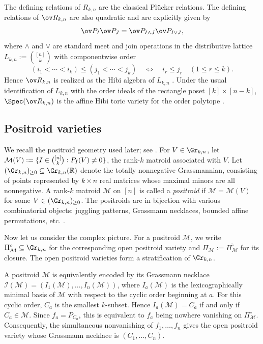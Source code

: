 \documentclass[11pt]{amsart}
\numberwithin{equation}{section}
\newcommand{\bR}{{\mathbb R}}
\begin{document}
The defining relations of  $R_{k,n}$ are the classical Pl\"ucker relations. 
The defining relations of $\ov R_{k,n}$ are also quadratic and are explicitly given by
\begin{equation}\label{eq:Hibi-relation}
\ov P_I\ov P_J
=
\ov P_{I\wedge J}\ov P_{I\vee J},
\end{equation}
where $\wedge$ and $\vee$ are standard meet and join operations in the distributive lattice
$L_{k,n}:=\binom{[n]}k$ with componentwise order
\[
(i_1<\cdots<i_k)\leq(j_1<\cdots<j_k)
\quad\Longleftrightarrow\quad
i_r\leq j_r\quad(1\leq r\leq k).
\]
Hence $\ov R_{k,n}$ is realized as the  Hibi algebra of $L_{k,n}$ \cite{Hibi87}.
Under the usual identification of $L_{k,n}$ with the order ideals of
the rectangle poset $[k]\times[n-k]$,
$\Spec(\ov R_{k,n})$ is the affine Hibi toric variety for the order polytope
\cite{Sta86}.


\subsection{Positroid varieties}
\label{subsec:positroid-varieties-prelim}

We recall the positroid geometry used later; see
\cite{Pos06,KLS13}.  For $V\in\Gr_{k,n}$, let
$\mathcal M(V):=\{I\in\tbinom{[n]}k:P_I(V)\neq0\}$, the
rank-$k$ matroid associated with $V$.  Let
$(\Gr_{k,n})_{\geq0}\subseteq\Gr_{k,n}(\bR)$ denote the totally
nonnegative Grassmannian, consisting of points represented by
$k\times n$ real matrices whose maximal minors are all
nonnegative.  A rank-$k$ matroid $\mathcal M$ on $[n]$ is
called a \emph{positroid} if
$\mathcal M=\mathcal M(V)$ for some
$V\in(\Gr_{k,n})_{\geq0}$. The positroids are in bijection with various combinatorial objects: juggling patterns, Grassmann necklaces, bounded affine permutations, etc. \cite{Pos06}. 

Now let us consider the complex picture.
For a positroid $\mathcal M$, we write
$\Pi^\circ_{\mathcal M}\subseteq\Gr_{k,n}$ for the corresponding
open positroid variety and
$\Pi_{\mathcal M}:=\overline{\Pi^\circ_{\mathcal M}}$ for its
closure.  The open positroid varieties form a stratification of
$\Gr_{k,n}$.

A positroid $\mathcal M$ is equivalently encoded by its Grassmann
necklace
$\mathcal I(\mathcal M)=(I_1(\mathcal M),\ldots,I_n(\mathcal M))$,
where $I_a(\mathcal M)$ is the lexicographically minimal basis of
$\mathcal M$ with respect to the cyclic order beginning at $a$.
For this cyclic order, $C_a$ is the smallest $k$-subset.  Hence
$I_a(\mathcal M)=C_a$ if and only if $C_a\in\mathcal M$.  Since
$f_a=P_{C_a}$, this is equivalent to $f_a$ being nowhere vanishing
on $\Pi^\circ_{\mathcal M}$.  Consequently, the simultaneous
nonvanishing of $f_1,\ldots,f_n$ gives the open positroid variety
whose Grassmann necklace is $(C_1,\ldots,C_n)$.
\end{document}
